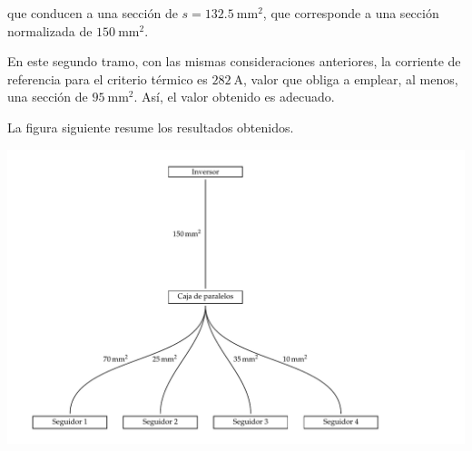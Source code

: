 que conducen a una sección de $s=\SI{132.5}{\milli\meter\squared}$,
que corresponde a una sección normalizada de
$\SI{150}{\milli\meter\squared}$.

En este segundo tramo, con las mismas consideraciones anteriores, 
la corriente de referencia para el criterio
térmico es $\SI{282}{\ampere}$, valor que obliga a emplear, al menos,
una sección de $\SI{95}{\milli\meter\squared}$. Así, el valor obtenido
es adecuado.

La figura siguiente resume los resultados obtenidos.

\begin{center}
\includegraphics{../figs/Cableado}  
\end{center}


